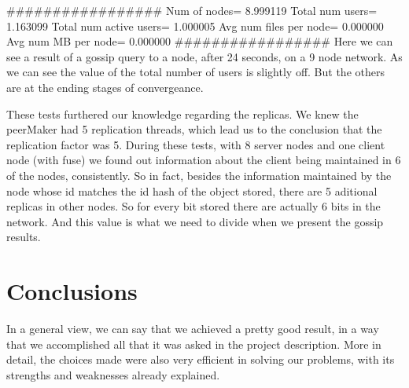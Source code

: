 \documentclass[times,9pt,article]{llncs}
\begin{document}
#################
Num of nodes= 8.999119
Total num users= 1.163099
Total num active users= 1.000005
Avg num files per node= 0.000000
Avg num MB per node= 0.000000
#################
Here we can see a result of a gossip query to a node, after 24 seconds, on a 9 node network.
As we can see the value of the total number of users is slightly off. But the others are at
the ending stages of convergeance.

These tests furthered our knowledge regarding the replicas. We knew the peerMaker had 5 replication threads, which lead us to the conclusion that the replication factor was 5. During these tests, with 8 server nodes and one client node (with fuse) we found out information about the client being maintained in 6 of the nodes, consistently. So in fact, besides the information maintained by the node whose id matches the id hash of the object stored, there are 5 aditional replicas in other nodes. So for every bit stored there are actually 6 bits in the network. And this value is what we need to divide when we present the gossip results.



\section{Conclusions}
In a general view, we can say that we achieved a pretty good result, in a way that we accomplished all that it was asked in the project description.
More in detail, the choices made were also very efficient in solving our problems, with its strengths and weaknesses already explained.
\end{document}

